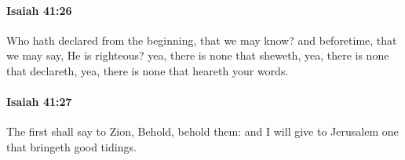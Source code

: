 		\paragraph{Isaiah 41:26} %
			\label{ISAIAH-41-26}

			Who hath declared from the beginning, that we may know? and beforetime, that we may say, He is righteous? yea, there is none that sheweth, yea, there is none that declareth, yea, there is none that heareth your words.


		\paragraph{Isaiah 41:27} %
			\label{ISAIAH-41-27}

			The first shall say to Zion, Behold, behold them: and I will give to Jerusalem one that bringeth good tidings.


